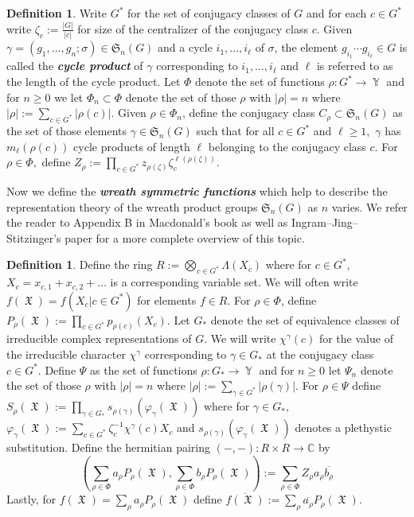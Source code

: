 \documentclass[12pt,reqno]{amsart}
\theoremstyle{definition}
\newtheorem{defn}[thm]{Definition}
\DeclareMathOperator{\Par}{\mathbb{Y}}
\DeclareMathOperator{\fX}{\mathfrak{X}}
\begin{document}
\begin{defn}
    Write $G^*$ for the set of conjugacy classes of $G$ and for each $c \in G^*$ write $\zeta_c := \frac{|G|}{|c|}$ for size of the centralizer of the conjugacy class $c.$ Given $\gamma = (g_1,\ldots,g_n;\sigma) \in \mathfrak{S}_n(G)$ and a cycle $i_1,\ldots,i_{\ell}$ of $\sigma$, the element $g_{i_1}\cdots g_{i_{\ell}} \in G$ is called the \textit{\textbf{cycle product}} of $\gamma$ corresponding to $i_1,\ldots,i_{\ell}$ and $\ell$ is referred to as the length of the cycle product. Let $\Phi$ denote the set of functions $\rho: G^* \rightarrow \Par$ and for $n \geq 0$ we let $\Phi_n \subset \Phi$ denote the set of those $\rho$ with $|\rho| = n$ where $|\rho|:= \sum_{c \in G^*} |\rho(c)|.$ Given $\rho \in \Phi_n$, define the conjugacy class $C_{\rho} \subset \mathfrak{S}_n(G)$ as the set of those elements $\gamma \in \mathfrak{S}_n(G)$ such that for all $c \in G^*$ and $\ell \geq 1,$ $\gamma$ has $m_{\ell}(\rho(c))$ cycle products of length $\ell$ belonging to the conjugacy class $c.$ For $\rho \in \Phi,$ define $Z_{\rho}:= \prod_{c \in G^*} z_{\rho(\zeta)} \zeta_c^{\ell(\rho(\zeta))}.$
\end{defn}

Now we define the \textit{\textbf{wreath symmetric functions}} which help to describe the representation theory of the wreath product groups $\mathfrak{S}_n(G)$ as $n$ varies. We refer the reader to Appendix B in Macdonald's book \cite{Macdonald} as well as Ingram--Jing--Stitzinger's paper \cite{IJS09} for a more complete overview of this topic.

\begin{defn}
    Define the ring $R:= \bigotimes_{c \in G^*} \Lambda(X_{c})$ where for $c \in G^*$, $X_{c} = x_{c,1}+x_{c,2}+\ldots$ is a corresponding variable set. We will often write $f(\fX) = f(X_{c}| c \in G^*)$ for elements $f \in R.$ 
    For $\rho \in \Phi$, define 
    $P_{\rho}(\fX):= \prod_{c \in G^*} p_{\rho(c)}(X_{c}) .$ Let $G_*$ denote the set of equivalence classes of irreducible complex representations of $G.$ We will write $\chi^{\gamma}(c)$ for the value of the irreducible character $\chi^{\gamma}$ corresponding to $\gamma \in G_*$ at the conjugacy class $c \in G^*.$ Define $\Psi$ as the set of functions $\rho:G_* \rightarrow \Par$ and for $n \geq 0$ let $\Psi_n$ denote the set of those $\rho$ with $|\rho| = n$ where $|\rho|:= \sum_{\gamma \in G^*} |\rho(\gamma)|.$ For $\rho \in \Psi$ define  
    $S_{\rho}(\fX):= \prod_{\gamma \in G_*} s_{\rho(\gamma)}(\varphi_{\gamma}(\fX))$ where for $\gamma \in G_*$, 
    $\varphi_{\gamma}(\fX):= \sum_{c\in G^*}  \zeta_c^{-1}\chi^{\gamma}(c) X_c$ and $s_{\rho(\gamma)}(\varphi_{\gamma}(\fX))$ denotes a plethystic substitution. 
    Define the hermitian pairing $(-,-):R\times R \rightarrow \mathbb{C}$ by 
    $$\left( \sum_{\rho \in \Phi} a_{\rho} P_{\rho}(\fX) , \sum_{\rho \in \Phi} b_{\rho} P_{\rho}(\fX) \right):= \sum_{\rho \in \Phi} Z_{\rho} a_{\rho} \overline{b_{\rho}}$$ Lastly, for $f(\fX) = \sum_{\rho } a_{\rho} P_{\rho}(\fX)$ define $\overline{f(\fX)}:= \sum_{\rho } \overline{a_{\rho}} P_{\rho}(\fX).$
\end{defn}
\end{document}
